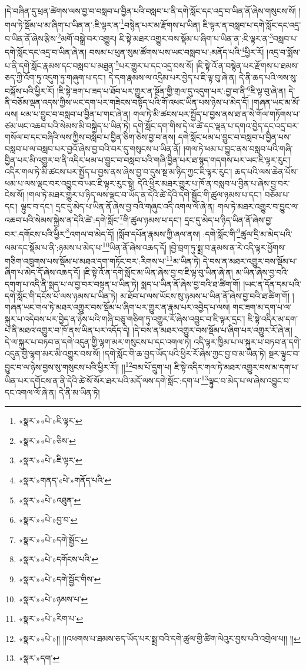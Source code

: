 །དེ་བཞིན་དུ་ཕྲན་ཚེགས་ལས་བྱ་བ་བསླབ་པ་བྱིན་པའི་བསླབ་པ་ནི་དགེ་སློང་དང་འདྲ་བ་ཡིན་ནོ་ཞེས་གསུངས་སོ། །གལ་ཏེ་སྡོམ་པ་མ་ཞིག་པ་ཡིན་ན་:ཇི་ལྟར་ན་\footnote{«སྣར་»«པེ་»ཇི་ལྟར་}བསྙེན་པར་མ་རྫོགས་པ་ཡིན། ཇི་ལྟར་ན་བསླབ་པ་དགེ་སློང་དང་འདྲ་བ་ཡིན་ནོ་ཞེས་རྩིས་\footnote{«སྣར་»«པེ་»ཅིས་}མགོ་བསྒྲེ་བར་འགྱུར། ཇི་སྟེ་མཐར་འགྱུར་བས་སྡོམ་པ་ཞིག་པ་ཡིན་ན་:ཇི་ལྟར་ན་\footnote{«སྣར་»«པེ་»ཇི་ལྟར་}བསླབ་པ་དགེ་སློང་དང་འདྲ་བ་ཡིན་ཞེ་ན། བསམ་པ་ཕུན་སུམ་ཚོགས་པས་ཡང་བསླབ་པ་:མནོད་པའི་\footnote{«སྣར་»གནད་«པེ་»གནོད་པའི་}ཕྱིར་རོ། །འདྲ་བ་སྨོས་པ་ནི་དགེ་སློང་རྣམས་དང་བསླབ་པ་མཐུན་\footnote{«སྣར་»«པེ་»འཐུན་}པར་གྱུར་པ་དང་འདྲ་བས་སོ། །ཇི་སྟེ་འོ་ན་བསྙེན་པར་རྫོགས་པ་ཐམས་ཅད་ཀྱི་འོག་ཏུ་འདུག་ཏུ་གཞུག་པ་དང་། དེ་དག་རྣམས་ལ་འདྲིམ་པར་བྱེད་པ་ཇི་ལྟ་བུ་ཞེ་ན། དེ་ནི་ཆད་པའི་ལས་སུ་བསྐོས་པའི་ཕྱིར་རོ། །ཇི་སྟེ་ཟག་པ་ཟད་པ་ཐོབ་པར་གྱུར་ན་སྔོན་གྱི་གྲལ་དུ་འདུག་པར་:བྱ་བ་ནི་\footnote{«སྣར་»«པེ་»བྱ་བ་}ཇི་ལྟ་བུ་ཞེ་ན། དེ་ནི་བཅོམ་ལྡན་འདས་ཀྱིས་ཡང་དག་པར་གཟེངས་བསྟོད་པའི་གོ་འཕང་ཡིན་པས་ཉེས་པ་མེད་དོ། །གཞན་ཡང་མ་མོ་ལས། ཕམ་པ་བྱུང་བ་བསླབ་པ་བྱིན་པ་གང་ཞེ་ན། གལ་ཏེ་མི་ཚངས་པར་སྤྱོད་པ་བྱས་ནས་ཐ་ན་སེ་གོལ་གཏོགས་པ་ཙམ་ཡང་འཆབ་པའི་སེམས་མི་བསྐྱེད་པ་ཡིན་ཏེ། དགེ་སློང་དག་གིས་དེ་ལ་ཚེ་དང་ལྡན་པ་དགའ་བྱེད་དང་འདྲ་བར་གསོལ་བ་དང་བཞིའི་ལས་ཀྱིས་བསླབ་པ་བྱིན་ཅིག་ཅེས་བྱ་བ་ནས། དགེ་སློང་ཕམ་པ་བྱུང་བ་བསླབ་པ་བྱིན་པས་བསླབ་པ་ལ་བསླབ་པར་བྱའོ་ཞེས་བྱ་བའི་བར་དུ་གསུངས་པ་ཡིན་ནོ། །གལ་ཏེ་ཕམ་པ་བྱུང་ནས་བསླབ་པའི་གཞི་བྱིན་པར་མི་འགྱུར་བ་ནི་འདིར་ཕམ་པ་བྱུང་བ་བསླབ་པའི་གཞི་བྱིན་པར་ཐ་སྙད་གདགས་པར་ཡང་ཇི་ལྟར་རུང་། འདིར་གལ་ཏེ་མི་ཚངས་པར་སྤྱོད་པ་བྱས་ནས་ཞེས་བྱ་བ་དུས་སྔ་མ་ཉིད་ཀྱང་ཇི་ལྟར་རུང་། ཆད་པའི་ལས་ཆེན་པོས་ཕམ་པ་ལས་ལྡང་བར་འབྱུང་བ་ཡང་ཇི་ལྟར་རུང་སྟེ། དེའི་ཕྱིར་མཐར་གྱུར་པ་ཁོ་ན་བསླབ་པ་བྱིན་པ་ཞེས་བྱ་བར་ངེས་སོ། །གལ་ཏེ་མཐར་གྱུར་པ་ཉིད་ལས་ལྡང་བ་ཡོད་ན་དེའི་ཚེ་དེའི་དགེ་སྦྱོང་གི་ཚུལ་ཉམས་པ་དང་། བཅོམ་པ་དང་། ལྟུང་བ་དང་། དྲང་དུ་མེད་པ་ཡིན་ནོ་ཞེས་བྱ་བའི་གཞུང་འདི་འགལ་ལོ་ཞེ་ན། གལ་ཏེ་མཐར་འགྱུར་བ་བྱུང་ལ་འཆབ་པའི་སེམས་སྐྱེས་ན་དེའི་ཚེ་:དགེ་སློང་\footnote{«སྣར་»«པེ་»དགེ་སྦྱོང་}གི་ཚུལ་ཉམས་པ་དང་། དྲང་དུ་མེད་པ་ཉིད་ཡིན་ནོ་ཞེས་བྱ་བར་:དགོངས་པའི་ཕྱིར་\footnote{«སྣར་»«པེ་»དགོངས་པའི་}འགལ་བ་མེད་དོ། །སློབ་དཔོན་རྣམས་ཀྱི་ཞལ་ནས། :དགེ་སློང་གི་\footnote{«སྣར་»«པེ་»དགེ་སྦྱོང་གིས་}ཚུལ་དྲི་མ་མེད་པའི་ལམ་དང་སྡོམ་པ་ནི་:ཉམས་པ་མེད་པ་\footnote{«སྣར་»«པེ་»ཉམས་པ་}ཡིན་ནོ་ཞེས་འཆད་དོ། །བྱེ་བྲག་ཏུ་སྨྲ་བ་རྣམས་ན་རེ་འདི་ལྟར་ཕྱོགས་གཅིག་འཁྲུགས་པས་སྡོམ་པ་མཐའ་དག་གཏོང་བར་:རིགས་པ་\footnote{«སྣར་»«པེ་»རིག་པ་}མ་ཡིན་ཏེ། དེ་བས་ན་མཐར་འགྱུར་བས་སྡོམ་པ་ཞིག་པ་མེད་དོ་ཞེས་འཆད་དོ། །ཇི་སྟེ་འོ་ན་དགེ་སློང་མ་ཡིན་ཞེས་བྱ་བ་ཇི་ལྟ་བུ་ཡིན་ཞེ་ན། མ་ཡིན་ཞེས་བྱ་བའི་དགག་པ་འདི་ནི་སྨད་པ་ལ་བྱ་བར་བསྟན་པ་ཡིན་ཏེ། སྨད་པ་ཡིན་ནོ་ཞེས་བྱ་བའི་ཐ་ཚིག་གོ། །ཡང་ན་དོན་དམ་པའི་དགེ་སློང་གི་དངོས་པོ་ལས་ཉམས་པ་ཡིན་ཏེ། མ་ཐོབ་པ་ལས་ཡོངས་སུ་ཉམས་པ་ཡིན་ནོ་ཞེས་བྱ་བའི་ཐ་ཚིག་གོ། །གཞན་ཡང་གལ་ཏེ་མཐར་འགྱུར་བས་སྡོམ་པ་ཞིག་པར་གྱུར་ན་རྣམ་པར་འབྱེད་པ་ལས། གང་ཟག་མ་དག་པ་ལ་སྐུར་པ་འདེབས་པར་བྱེད་ན་ཉེས་པའི་གཞི་བཅུ་གཅིག་ཏུ་འགྱུར་རོ་ཞེས་འབྱུང་བ་ཇི་ལྟར་དྲང་། ཇི་སྟེ་འདིར་མ་དག་པ་ནི་མཐའ་འགྱུར་བ་ཁོ་ནས་ཡིན་པར་འདོད་དེ། །དེ་བས་ན་མཐར་འགྱུར་བས་སྡོམ་པ་ཞིག་པར་འགྱུར་རོ་ཞེ་ན། དེ་ལ་སྐུར་པ་བཏབ་ན་དགེ་འདུན་གྱི་ལྷག་མར་གསུངས་པ་དང་འགལ་ཏེ། འདི་ལྟར་ཁྱིམ་པ་ལ་སྐུར་པ་བཏབ་ན་དགེ་འདུན་གྱི་ལྷག་མར་མི་འགྱུར་བས་སོ། །དགེ་སློང་གི་ཆ་བྱད་ཡོད་པའི་ཕྱིར་རོ་ཞེས་ཀྱང་བྱ་བ་མ་ཡིན་ཏེ། སྔར་ལྟུང་བ་བྱུང་བ་ལ་ཉེས་བྱས་སུ་གསུངས་པའི་ཕྱིར་རོ།། །།\footnote{«སྣར་»«པེ་»།། །།འཕགས་པ་ཐམས་ཅད་ཡོད་པར་སྨྲ་བའི་དགེ་ཚུལ་གྱི་ཚིག་ལེའུར་བྱས་པའི་འགྲེལ་པ།། །།}བམ་པོ་དྲུག་པ། ཇི་སྟེ་འདིར་གལ་ཏེ་མཐར་འགྱུར་བས་མ་དག་པ་ཡིན་པར་དགོངས་ན་ནི་དེའི་ཚེ་སོ་སོར་ཐར་པའི་མདོ་ལས་དགེ་སློང་:དག་པ་\footnote{«སྣར་»དག་}ལྟུང་བ་མེད་པ་ལ་ཞེས་འབྱུང་བ་དང་འགལ་ལོ་ཞེ་ན། དེ་ནི་མ་ཡིན་ཏེ། 